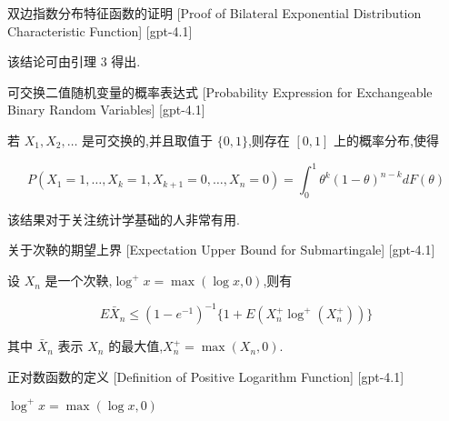 \documentclass[UTF8]{ctexart}
\begin{document}
    
    
    \begin{prf}
        {双边指数分布特征函数的证明}
        [Proof of Bilateral Exponential Distribution Characteristic Function]
        [gpt-4.1]
        
该结论可由引理 3 得出.

    \end{prf}
    
    
    
    \begin{thm}
        {可交换二值随机变量的概率表达式}
        [Probability Expression for Exchangeable Binary Random Variables]
        [gpt-4.1]
        
若 $X_1, X_2, \dots$ 是可交换的,并且取值于 $\{0, 1\}$,则存在 $[0,1]$ 上的概率分布,使得

\[
P(X_1 = 1, \ldots, X_k = 1, X_{k+1} = 0, \ldots, X_n = 0) = \int_0^1 \theta^k (1 - \theta)^{n - k} dF(\theta)
\]

该结果对于关注统计学基础的人非常有用.

    \end{thm}
    
    
    
    \begin{thm}
        {关于次鞅的期望上界}
        [Expectation Upper Bound for Submartingale]
        [gpt-4.1]
        
设 $X_{n}$ 是一个次鞅,$\log^{+} x = \max( \log x , 0 )$,则有

\[
E \bar{X}_{n} \leq ( 1 - e^{-1} )^{-1} \{ 1 + E ( X_{n}^{+} \log^{+} ( X_{n}^{+} ) ) \}
\]

其中 $\bar{X}_{n}$ 表示 $X_{n}$ 的最大值,$X_{n}^{+} = \max(X_{n}, 0)$.

    \end{thm}
    
    
    
    \begin{dfn}
        {正对数函数的定义}
        [Definition of Positive Logarithm Function]
        [gpt-4.1]
        
$\log^{+} x = \max( \log x , 0 )$

    \end{dfn}
    
    
    
\end{document}
